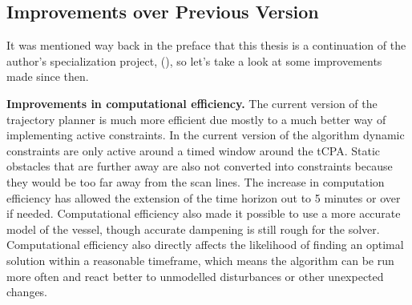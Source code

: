 \subsection{Improvements over Previous Version}
It was mentioned way back in the preface that this thesis is a continuation of the author's specialization project, (\cite{Hestvik2021}), so let's take a look at some improvements made since then.

\textbf{Improvements in computational efficiency.} \newline
The current version of the trajectory planner is much more efficient due mostly to a much better way of implementing active constraints.
In the current version of the algorithm dynamic constraints are only active around a timed window around the tCPA. Static obstacles that
are further away are also not converted into constraints because they would be too far away from the scan lines. The increase in
computation efficiency has allowed the extension of the time horizon out to 5 minutes or over if needed. Computational efficiency also 
made it possible to use a more accurate model of the vessel, though accurate dampening is still rough for the solver. Computational 
efficiency also directly affects the likelihood of finding an optimal solution within a reasonable timeframe, which means the algorithm can be run
more often and react better to unmodelled disturbances or other unexpected changes.

